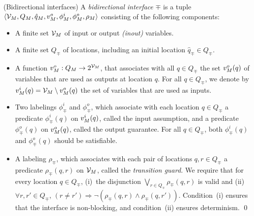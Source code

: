 \begin{defi}{(Bidirectional interfaces)}
A \emph{bidirectional interface} $\mp$ is a tuple 
$\langle {\cal V}_M,Q_M,\hat{q}_M,v^o_M,\phi^i_M,\phi^o_M,\rho_M \rangle$
consisting of the following components: 
%
\begin{itemize}
\item A finite set ${\cal V}_M$ of input or output {\em (inout)} variables.

\item A finite set $Q_\mp$ of locations, including an initial location
$\hat{q}_\mp \in Q_\mp$.

\item A function $v^o_M: Q_M \rightarrow 2^{{\cal V}_M}$, that
associates with all $q \in Q_\mp$ the set $v^o_M(q)$ of variables
that are used as outputs at location $q$.
For all $q \in Q_\mp$, 
we denote by $v^i_M(q) = {\cal V}_M \setminus v^o_M(q)$ the set
of variables that are used as inputs.

\item Two labelings $\phi^i_\mp$ and $\phi^o_\mp$, which associate with
each location $q \in Q_\mp$ a predicate $\phi^i_\mp(q)$ on $v^i_M(q)$, called 
the input assumption, and a predicate $\phi^o_\mp(q)$ on $v^o_M(q)$,
called the output guarantee. 
For all $q \in Q_\mp$, both $\phi^i_\mp(q)$ and $\phi^o_\mp(q)$ should be
satisfiable. 

\item A labeling $\rho_\mp$, which associates with each pair of locations
$q,r \in Q_\mp$ a predicate $\rho_\mp(q,r)$ on ${\cal V}_M$,
called the {\em transition guard.}
We require that for every location $q \in Q_\mp$, (i)~the disjunction
$\bigvee_{r \in Q_\mp}\rho_\mp(q,r)$ is valid and (ii)~$\forall r, r'
\in Q_\mp$, $(r \neq r') \Rightarrow \lnot (\rho_\mp(q,r) \land
\rho_\mp(q,r'))$.
Condition~(i)  ensures that the interface is non-blocking, and
condition~(ii) ensures determinism. 
\qed 

\end{itemize}
\end{defi}

